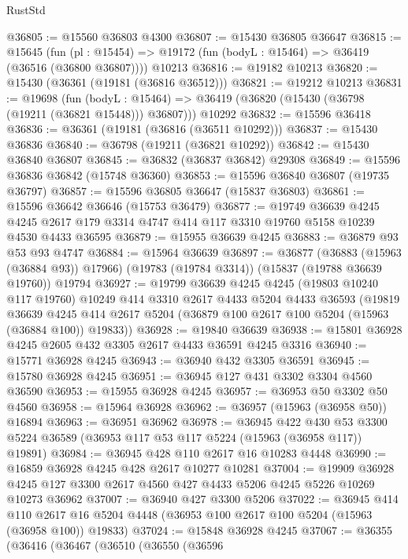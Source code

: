 \begin{lexlean}{RustStd}
\begin{coremodule}
{\begin{coremodule}
{{{{{{{{{{{{{{{{{{{{{{{{{{{{{{{{{{{{{{{{{{{{{{{{{{{{{{{{{{{{@36805 := @15560 @36803 @4300
@36807 := @15430 @36805 @36647
@36815 := @15645
    (fun (pl : @15454) => @19172 (fun (bodyL : @15464) => @36419 (@36516 (@36800 @36807))))
    @10213
@36816 := @19182 @10213
@36820 := @15430 (@36361 (@19181 (@36816 @36512)))
@36821 := @19212 @10213
@36831 := @19698
    (fun (bodyL : @15464) => @36419 (@36820 (@15430 (@36798 (@19211 (@36821 @15448))) @36807)))
    @10292
@36832 := @15596 @36418
@36836 := @36361 (@19181 (@36816 (@36511 @10292)))
@36837 := @15430 @36836
@36840 := @36798 (@19211 (@36821 @10292))
@36842 := @15430 @36840 @36807
@36845 := @36832 (@36837 @36842) @29308
@36849 := @15596 @36836 @36842 (@15748 @36360)
@36853 := @15596 @36840 @36807 (@19735 @36797)
@36857 := @15596 @36805 @36647 (@15837 @36803)
@36861 := @15596 @36642 @36646 (@15753 @36479)
@36877 := @19749
    @36639
    @4245
    @4245
    @2617
    @179
    @3314
    @4747
    @414
    @117
    @3310
    @19760
    @5158
    @10239
    @4530
    @4433
    @36595
@36879 := @15955 @36639 @4245
@36883 := @36879 @93 @53 @93 @4747
@36884 := @15964 @36639
@36897 := @36877
    (@36883 (@15963 (@36884 @93)) @17966)
    (@19783 (@19784 @3314))
    (@15837 (@19788 @36639 @19760))
    @19794
@36927 := @19799
    @36639
    @4245
    @4245
    (@19803 @10240 @117 @19760)
    @10249
    @414
    @3310
    @2617
    @4433
    @5204
    @4433
    @36593
    (@19819
      @36639
      @4245
      @414
      @2617
      @5204
      (@36879 @100 @2617 @100 @5204 (@15963 (@36884 @100)) @19833))
@36928 := @19840 @36639
@36938 := @15801 @36928 @4245 @2605 @432 @3305 @2617 @4433 @36591 @4245 @3316
@36940 := @15771 @36928 @4245
@36943 := @36940 @432 @3305 @36591
@36945 := @15780 @36928 @4245
@36951 := @36945 @127 @431 @3302 @3304 @4560 @36590
@36953 := @15955 @36928 @4245
@36957 := @36953 @50 @3302 @50 @4560
@36958 := @15964 @36928
@36962 := @36957 (@15963 (@36958 @50)) @16894
@36963 := @36951 @36962
@36978 := @36945
    @422
    @430
    @53
    @3300
    @5224
    @36589
    (@36953 @117 @53 @117 @5224 (@15963 (@36958 @117)) @19891)
@36984 := @36945 @428 @110 @2617 @16 @10283 @4448
@36990 := @16859 @36928 @4245 @428 @2617 @10277 @10281
@37004 := @19909
    @36928
    @4245
    @127
    @3300
    @2617
    @4560
    @427
    @4433
    @5206
    @4245
    @5226
    @10269
    @10273
    @36962
@37007 := @36940 @427 @3300 @5206
@37022 := @36945
    @414
    @110
    @2617
    @16
    @5204
    @4448
    (@36953 @100 @2617 @100 @5204 (@15963 (@36958 @100)) @19833)
@37024 := @15848 @36928 @4245
@37067 := @36355
    (@36416
      (@36467
        (@36510
          (@36550
            (@36596
}}}}}}}}}}}}}}}}}}}}}}}}}}}}}}}}}}}}}}}}}}}}}}}}}}}}}}}}}}}}
\end{coremodule}}
\end{coremodule}
\end{lexlean}
